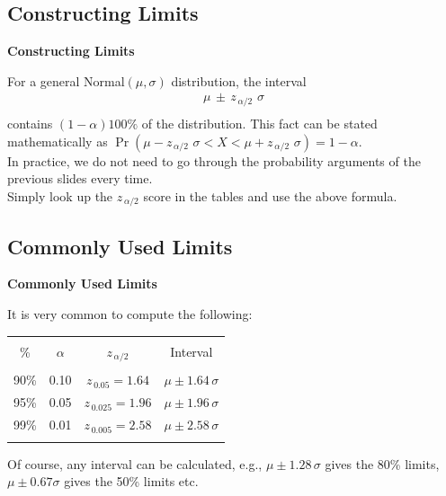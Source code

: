 \documentclass[compress]{beamer}        %
\makeatletter
\newcommand{\tcb}{\textcolor{beamer@blendedblue}}
\makeatother
\begin{document}
\subsection{Constructing Limits}
\begin{frame}{\bf \tcb{Constructing Limits}}

For a general Normal$(\mu,\sigma)$ distribution, the interval\\
\begin{align*}
\boxed{\mu \, \pm \, z_{\,\alpha/2} \,\, \sigma}\\[-0.2cm]
\end{align*}
contains $(1-\alpha)100\%$ of the distribution. This fact can be stated\\[0.1cm] mathematically as $\Pr(\mu - z_{\,\alpha/2} \,\, \sigma < X < \mu + z_{\,\alpha/2} \,\, \sigma) = 1 - \alpha$.\\[0.7cm]

In practice, we do not need to go through the probability arguments of the previous slides every time.\\[0.7cm]

Simply look up the $z_{\,\alpha/2}$ score in the tables and use the above formula.

\end{frame}


\subsection{Commonly Used Limits}
\begin{frame}{\bf \tcb{Commonly Used Limits}}

It is very common to compute the following:\\
\begin{center}
\begin{tabular}{|cccc|}
\hline
&&&\\[-0.3cm]
\% & $\alpha$ & $z_{\,\alpha/2}$ & Interval \\[0.1cm]
\hline
&&&\\[-0.3cm]
90\% & 0.10 & $z_{\,0.05} =1.64$ & $\mu \pm 1.64 \, \sigma$\\[0.4cm]
95\% & 0.05 & $z_{\,0.025} =1.96$ & $\mu \pm 1.96 \, \sigma$\\[0.4cm]
99\% & 0.01 & $z_{\,0.005} =2.58$ & $\mu \pm 2.58 \, \sigma$\\[0.1cm]
\hline
\multicolumn{4}{c}{}
\end{tabular}
\end{center}

Of course, any interval can be calculated, e.g., $\mu \pm 1.28 \, \sigma$ gives the 80\% limits, $\mu \pm 0.67 \sigma$ gives the 50\% limits etc.

\end{frame}
\end{document}
